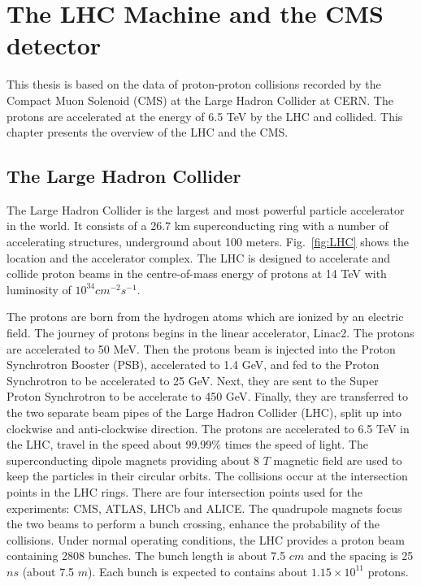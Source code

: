 \chapter{The LHC Machine and the CMS detector} %

\label{Chapter2} %

This thesis is based on the data of proton-proton collisions recorded by the Compact Muon Solenoid (CMS) at the Large Hadron Collider at CERN.
The protons are accelerated at the energy of 6.5 TeV by the LHC and collided.
This chapter presents the overview of the LHC and the CMS.

\section{The Large Hadron Collider}

The Large Hadron Collider is the largest and most powerful particle accelerator in the world.
It consists of a 26.7 km superconducting ring with a number of accelerating structures, underground about 100 meters. 
Fig.~\ref{fig:LHC} shows the location and the accelerator complex.
The LHC is designed to accelerate and collide proton beams in the centre-of-mass energy of protons at 14 TeV with luminosity of $10^{34} cm^{-2}s^{-1}$.~\cite{Evans:2008zzb}

The protons are born from the hydrogen atoms which are ionized by an electric field.
The journey of protons begins in the linear accelerator, Linac2. The protons are accelerated to 50 MeV.
Then the protons beam is injected into the Proton Synchrotron Booster (PSB), accelerated to 1.4 GeV, and fed to the Proton Synchrotron to be accelerated to 25 GeV.
Next, they are sent to the Super Proton Synchrotron to be accelerate to 450 GeV. 
Finally, they are transferred to the two separate beam pipes of the Large Hadron Collider (LHC), split up into clockwise and anti-clockwise direction.
The protons are accelerated to 6.5 TeV in the LHC, travel in the speed about 99.99\% times the speed of light.
The superconducting dipole magnets providing about 8 $T$ magnetic field are used to keep the particles in their circular orbits.
The collisions occur at the intersection points in the LHC rings. There are four intersection points used for the experiments: CMS, ATLAS, LHCb and ALICE.
The quadrupole magnets focus the two beams to perform a bunch crossing, enhance the probability of the collisions.
Under normal operating conditions, the LHC provides a proton beam containing 2808 bunches.
The bunch length is about 7.5 $cm$ and the spacing is 25 $ns$ (about 7.5 $m$). Each bunch is expected to contains about $1.15 \times 10^{11}$ protons. %

